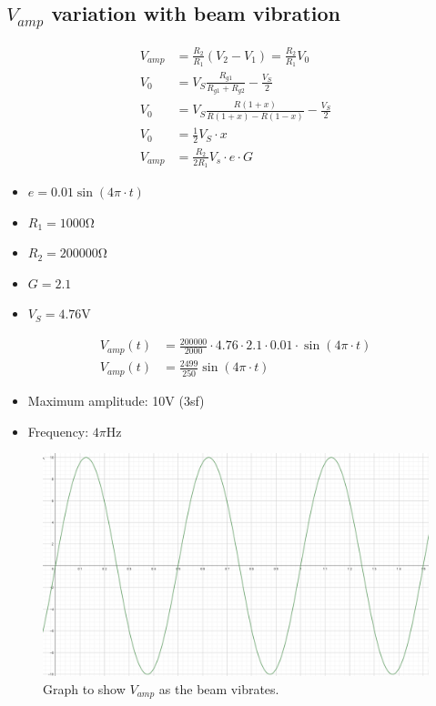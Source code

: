 \documentclass[12pt]{article}
\numberwithin{equation}{section}
\begin{document}
\subsection*{$V_{amp}$ variation with beam vibration}
\begin{align}
  V_{amp} &= \frac{R_2}{R_1} (V_2 - V_1) = \frac{R_2}{R_1} V_0\\
  V_0 &= V_S \frac{R_{g1}}{R_{g1} + R_{g2}} - \frac{V_S}{2}\\
  V_0 &= V_S \frac{R(1+x)}{R(1+x) - R(1-x)} - \frac{V_S}{2}\\
  V_0 &= \frac{1}{2}V_S \cdot x\\
  V_{amp} &= \frac{R_2}{2R_1} V_s \cdot e \cdot G
\end{align}
\begin{itemize}
  \item $e = 0.01 \sin{\left(4\pi \cdot t\right)}$
  \item $R_1 = 1000\si{\ohm}$
  \item $R_2 = 200000\si{\ohm}$
  \item $G = 2.1$
  \item $V_S = 4.76\si{\volt}$
\end{itemize}
\begin{align}
  V_{amp}(t) &= \frac{200000}{2000} \cdot 4.76 \cdot 2.1 \cdot 0.01 \cdot \sin{\left(4\pi \cdot t\right)}\\
  V_{amp}(t) &= \frac{2499}{250} \sin{\left(4\pi \cdot t\right)}
\end{align}
\begin{itemize}
  \item Maximum amplitude: 10\si{\volt} (3sf)
  \item Frequency: $4\pi \si{\hertz}$
\end{itemize}
\begin{figure}[H]
  \centering
  \includegraphics[width=\textwidth]{./img/5-2Vampresponse.png}
  \caption{Graph to show $V_{amp}$ as the beam vibrates.}
\end{figure}
\end{document}
